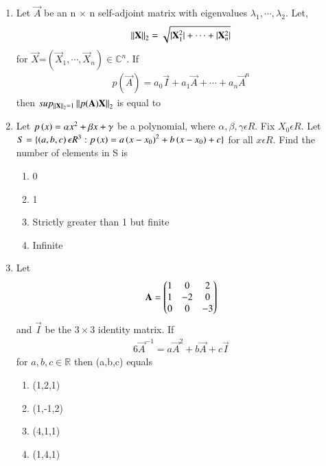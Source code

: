 \renewcommand{\theequation}{\theenumi}
\renewcommand{\thefigure}{\theenumi}
\begin{enumerate}[label=\thesection.\arabic*.,ref=\thesection.\theenumi]

\item Let $\vec{A}$ be an n $\times$ n self-adjoint matrix with eigenvalues $\lambda_1, \cdots, \lambda_2$.
Let,\begin{align} \left\lVert\mathbf{X}\right\rVert_2=\sqrt{\vert\mathbf{X}_{1}^{2}\vert+\cdots+\vert\mathbf{X}_{n}^{2}\vert}\end{align} for $\vec{X}$=$(\vec{X}_{1},\cdots,\vec{X}_{n})\in \mathbb{C}^n$. If \begin{align}
p(\vec{A})=a_0\vec{I}+a_1\vec{A}+\cdots+a_n\vec{A}^n
\end{align}
then $sup_{\left\lVert\mathbf{X}\right\rVert_{2}=1}\left\lVert p(\mathbf{A})\mathbf{X}\right\rVert_2$ is equal to
%
\\
\solution

\item Let $p \left(x\right)= \alpha x^2+\beta x + \gamma$ be a polynomial, where $\alpha,\beta,\gamma \epsilon R$. Fix $X_0 \epsilon R$. Let $S=\{\left(a,b,c\right)  \epsilon R^3: p \left(x\right)= a \left(x-x_0\right)^2+b \left(x-x_0\right)+ c\}$ for all $x\epsilon R$. Find the number of elements in S is
\begin{enumerate}
    \item 0
    \item 1
    \item Strictly greater than 1 but finite
    \item Infinite
\end{enumerate}
%
\solution

\item Let
\begin{align}
\mathbf{A}=\begin{pmatrix}1&0&2\\1&-2&0\\0&0&-3\end{pmatrix}
\end{align}
and $\vec{I}$ be the $3\times3$ identity matrix. If 
\begin{align}
6\vec{A}^{-1}=a\vec{A}^2+b\vec{A}+c\vec{I} \label{eq:solutions/2017/june/31/eq:1}
\end{align} for $a,b,c \in \mathbb{R}$ then (a,b,c) equals
\begin{enumerate}
\item (1,2,1)\\
\item (1,-1,2)\\
\item (4,1,1)\\
\item (1,4,1)
\end{enumerate}
\solution



\end{enumerate}
